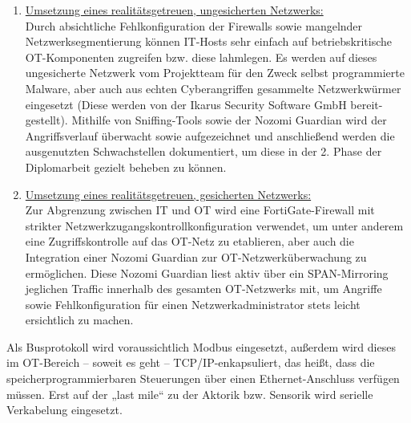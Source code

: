 \documentclass[
	headings=optiontotocandhead,%
	oneside,
	numbers=noenddot,%
	toc=flat, %
	10pt, %
	parskip=full, %
	listof=totoc, %
	listof=flat, %
	numbers=noenddot, %
	bibliography=totoc, %
	a4paper,DIV=14,
]{scrartcl}
\begin{document}
\begin{enumerate}
\item \underline{Umsetzung eines realitätsgetreuen, ungesicherten Netzwerks:}\\
Durch absichtliche Fehlkonfiguration der Firewalls sowie mangelnder Netzwerksegmentierung können IT-Hosts sehr einfach auf betriebskritische OT-Komponenten zugreifen bzw. diese lahmlegen. Es werden auf dieses ungesicherte Netzwerk vom Projektteam für den Zweck selbst programmierte Malware, aber auch aus echten Cyberangriffen gesammelte Netzwerkwürmer eingesetzt (Diese werden von der Ikarus Security Software GmbH bereit-gestellt). Mithilfe von Sniffing-Tools sowie der Nozomi Guardian wird der Angriffsverlauf überwacht sowie aufgezeichnet und anschließend werden die ausgenutzten Schwachstellen dokumentiert, um diese in der 2. Phase der Diplomarbeit gezielt beheben zu können.

\item \underline{Umsetzung eines realitätsgetreuen, gesicherten Netzwerks:}\\
Zur Abgrenzung zwischen IT und OT wird eine FortiGate-Firewall mit strikter Netzwerkzugangskontrollkonfiguration verwendet, um unter anderem eine Zugriffskontrolle auf das OT-Netz zu etablieren, aber auch die Integration einer Nozomi Guardian zur OT-Netzwerküberwachung zu ermöglichen. Diese Nozomi Guardian liest aktiv über ein SPAN-Mirroring jeglichen Traffic innerhalb des gesamten OT-Netzwerks mit, um Angriffe sowie Fehlkonfiguration für einen Netzwerkadministrator stets leicht ersichtlich zu machen.

\end{enumerate}
Als Busprotokoll wird voraussichtlich Modbus eingesetzt, außerdem wird dieses im OT-Bereich – soweit es geht – TCP/IP-enkapsuliert, das heißt, dass die speicherprogrammierbaren Steuerungen über einen Ethernet-Anschluss verfügen müssen. Erst auf der „last mile“ zu der Aktorik bzw. Sensorik wird serielle Verkabelung eingesetzt.
\end{document}

